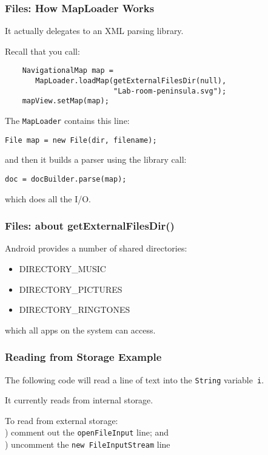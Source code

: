 \begin{frame}[fragile]
\frametitle{Files: How MapLoader Works}
\begin{changemargin}{1cm}
It actually delegates to an XML parsing library. 

Recall that you call:
\begin{verbatim}
    NavigationalMap map = 
       MapLoader.loadMap(getExternalFilesDir(null), 
                         "Lab-room-peninsula.svg");
    mapView.setMap(map);
\end{verbatim}

The {\tt MapLoader} contains this line:
\begin{verbatim}
File map = new File(dir, filename);
\end{verbatim}
and then it builds a parser using the library call:
\begin{verbatim}
doc = docBuilder.parse(map);
\end{verbatim}
which does all the I/O.

\end{changemargin}
\end{frame}

\begin{frame}
\frametitle{Files: about getExternalFilesDir()}

\begin{changemargin}{1cm}
Android provides a number of shared directories:
\begin{itemize}
\item DIRECTORY\_MUSIC
\item DIRECTORY\_PICTURES
\item DIRECTORY\_RINGTONES
\end{itemize}
which all apps on the system can access.

\end{changemargin}


\end{frame}

\begin{frame}
\frametitle{Reading from Storage Example}
\begin{changemargin}{1cm}

The following code will read a line of text
into the {\tt String} variable~{\tt i}.

It currently reads from internal storage.

To read from external storage: \\
) comment out the {\tt openFileInput} line; and\\
) uncomment the {\tt new FileInputStream} line
\end{changemargin}
\end{frame}

